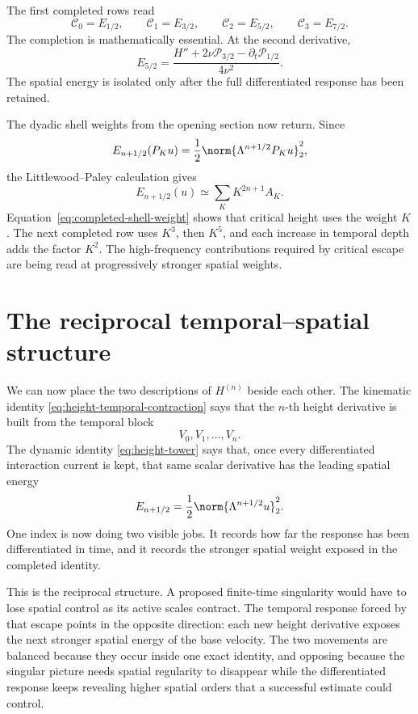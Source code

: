 The first completed rows read
\begin{equation*}
 \mathscr C_0=E_{1/2},
 \qquad
 \mathscr C_1=E_{3/2},
 \qquad
 \mathscr C_2=E_{5/2},
 \qquad
 \mathscr C_3=E_{7/2}.
\end{equation*}
The completion is mathematically essential.  At the second derivative,
\begin{equation*}
 E_{5/2}
 =\frac{H''+2\nu\mathcal P_{3/2}
              -\partial_t\mathcal P_{1/2}}
        {4\nu^2}.
\end{equation*}
The spatial energy is isolated only after the full differentiated response has
been retained.

The dyadic shell weights from the opening section now return.  Since
\begin{equation*}
 E_{n+1/2}(P_Ku)
 =\frac12\norm{\Lambda^{n+1/2}P_Ku}_2^2,
\end{equation*}
the Littlewood--Paley calculation gives
\begin{equation}
 E_{n+1/2}(u)
 \simeq\sum_KK^{2n+1}A_K.
 \label{eq:completed-shell-weight}
\end{equation}
Equation~\eqref{eq:completed-shell-weight} shows that critical height uses the
weight \(K\).  The next completed row uses \(K^3\),
then \(K^5\), and each increase in temporal depth adds the factor \(K^2\).
The high-frequency contributions required by critical escape are being read
at progressively stronger spatial weights.

\section{The reciprocal temporal--spatial structure}

We can now place the two descriptions of \(H^{(n)}\) beside each other.  The
kinematic identity \eqref{eq:height-temporal-contraction} says that the
\(n\)-th height derivative is built from the temporal block
\[
 V_0,V_1,\ldots,V_n.
\]
The dynamic identity \eqref{eq:height-tower} says that, once every
differentiated interaction current is kept, that same scalar derivative has
the leading spatial energy
\[
 E_{n+1/2}=\frac12\norm{\Lambda^{n+1/2}u}_2^2.
\]
One index is now doing two visible jobs.  It records how far the response has
been differentiated in time, and it records the stronger spatial weight
exposed in the completed identity.

This is the reciprocal structure.  A proposed finite-time singularity would
have to lose spatial control as its active scales contract.  The temporal
response forced by that escape points in the opposite direction: each new
height derivative exposes the next stronger spatial energy of the base
velocity.  The two movements are balanced because they occur inside one exact
identity, and opposing because the singular picture needs spatial regularity
to disappear while the differentiated response keeps revealing higher spatial
orders that a successful estimate could control.

